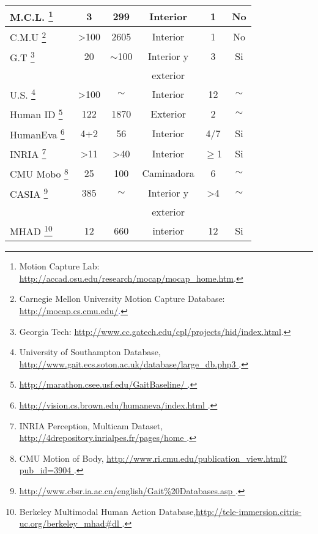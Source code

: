 \begin{table}[h!]
\begin{minipage}{\textwidth}
\begin{tabular}{||l|ccccc||}
\hline \hline
M.C.L. \footnote{Motion Capture Lab: \textcolor{blue}{\underline{\url{http://accad.osu.edu/research/mocap/mocap_home.htm}}}.}  
 & 3 		& 		299	   & Interior&     1    &    No      \\ \hline
C.M.U  \footnote{Carnegie Mellon University Motion Capture Database: 
\textcolor{blue}{\underline{\url{http://mocap.cs.cmu.edu/}}.}	
	}   & >100     &       2605   & Interior&      1   &    No       \\ \hline
G.T \footnote{Georgia Tech: \textcolor{blue}{\underline{\url{http://www.cc.gatech.edu/cpl/projects/hid/index.html}}}.} &       20    & $\sim$100           & Interior y &   3      &  Si       \\ 
		 &		 &					 & exterior        &         &    \\ \hline
U.S. \footnote{University of Southampton Database, \textcolor{blue}{\underline{\url{http://www.gait.ecs.soton.ac.uk/database/large_db.php3 }}}.} &       >100    &     $\sim$       & Interior &   12      &  $\sim$      \\ \hline
Human ID  \footnote{\textcolor{blue}{\underline{\url{http://marathon.csee.usf.edu/GaitBaseline/ }}}.} &     122    & 1870           & Exterior &   2      &$\sim$       \\ \hline
HumanEva \footnote{\textcolor{blue}{\underline{\url{http://vision.cs.brown.edu/humaneva/index.html }}}.}&     4+2    & 56           & Interior &   4/7      &  Si       \\ \hline
INRIA \footnote{INRIA Perception, Multicam Dataset, \textcolor{blue}{\underline{\url{http://4drepository.inrialpes.fr/pages/home  }}}.} &       >11    & >40           & Interior &   $\geq$1      &  Si       \\ \hline
CMU Mobo \footnote{CMU Motion of Body,  \textcolor{blue}{\underline{\url{http://www.ri.cmu.edu/publication_view.html?pub_id=3904 }}}.} &     25    & 100           & Caminadora &   6      &  $\sim$       \\ \hline
CASIA \footnote{ \textcolor{blue}{\underline{\url{http://www.cbsr.ia.ac.cn/english/Gait\%20Databases.asp
 }}}.}&     385    & $\sim$           & Interior y  &   >4      &  $\sim$       \\ 
 &         &            & exterior  &         &      \\ \hline
MHAD \footnote{Berkeley Multimodal Human Action Database,\textcolor{blue}{\underline{\url{http://tele-immersion.citris-uc.org/berkeley_mhad\#dl  }}}.} & 12         & 660            & interior  & 12        & Si      \\ 
\hline \hline



\end{tabular}
\end{minipage}
\end{table}
